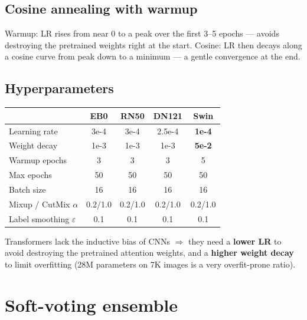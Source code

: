 \documentclass[11pt,a4paper]{article}
\begin{document}
\subsection{Cosine annealing with warmup}

\begin{simple}
Warmup: LR rises from near 0 to a peak over the first 3--5 epochs --- avoids destroying the pretrained weights right at the start.
Cosine: LR then decays along a cosine curve from peak down to a minimum --- a gentle convergence at the end.
\end{simple}

\subsection{Hyperparameters}

\begin{table}[h]
\centering\small
\begin{tabular}{lcccc}
\toprule
& \textbf{EB0} & \textbf{RN50} & \textbf{DN121} & \textbf{Swin} \\
\midrule
Learning rate       & 3e-4 & 3e-4 & 2.5e-4 & \textbf{1e-4} \\
Weight decay        & 1e-3 & 1e-3 & 1e-3   & \textbf{5e-2} \\
Warmup epochs       & 3    & 3    & 3      & 5 \\
Max epochs          & 50   & 50   & 50     & 50 \\
Batch size          & 16   & 16   & 16     & 16 \\
Mixup / CutMix $\alpha$ & 0.2/1.0 & 0.2/1.0 & 0.2/1.0 & 0.2/1.0 \\
Label smoothing $\varepsilon$ & 0.1 & 0.1 & 0.1 & 0.1 \\
\bottomrule
\end{tabular}
\end{table}

\begin{idea}
Transformers lack the inductive bias of CNNs $\Rightarrow$ they need a \textbf{lower LR} to avoid destroying the pretrained attention weights, and a \textbf{higher weight decay} to limit overfitting (28M parameters on 7K images is a very overfit-prone ratio).
\end{idea}

\section{Soft-voting ensemble}
\end{document}

